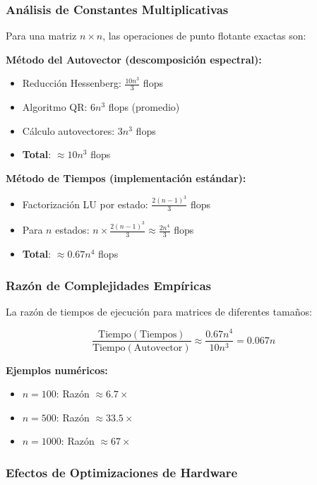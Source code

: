 \subsubsection{Análisis de Constantes Multiplicativas}

Para una matriz $n \times n$, las operaciones de punto flotante exactas son:

\textbf{Método del Autovector (descomposición espectral):}
\begin{itemize}
\item Reducción Hessenberg: $\frac{10n^3}{3}$ flops
\item Algoritmo QR: $6n^3$ flops (promedio)
\item Cálculo autovectores: $3n^3$ flops
\item \textbf{Total}: $\approx 10n^3$ flops
\end{itemize}

\textbf{Método de Tiempos (implementación estándar):}
\begin{itemize}
\item Factorización LU por estado: $\frac{2(n-1)^3}{3}$ flops
\item Para $n$ estados: $n \times \frac{2(n-1)^3}{3} \approx \frac{2n^4}{3}$ flops
\item \textbf{Total}: $\approx 0.67n^4$ flops
\end{itemize}

\subsubsection{Razón de Complejidades Empíricas}

La razón de tiempos de ejecución para matrices de diferentes tamaños:

\begin{equation}
\frac{\text{Tiempo}(\text{Tiempos})}{\text{Tiempo}(\text{Autovector})} \approx \frac{0.67n^4}{10n^3} = 0.067n
\end{equation}

\textbf{Ejemplos numéricos:}
\begin{itemize}
\item $n = 100$: Razón $\approx 6.7 \times$
\item $n = 500$: Razón $\approx 33.5 \times$
\item $n = 1000$: Razón $\approx 67 \times$
\end{itemize}

\subsubsection{Efectos de Optimizaciones de Hardware}

